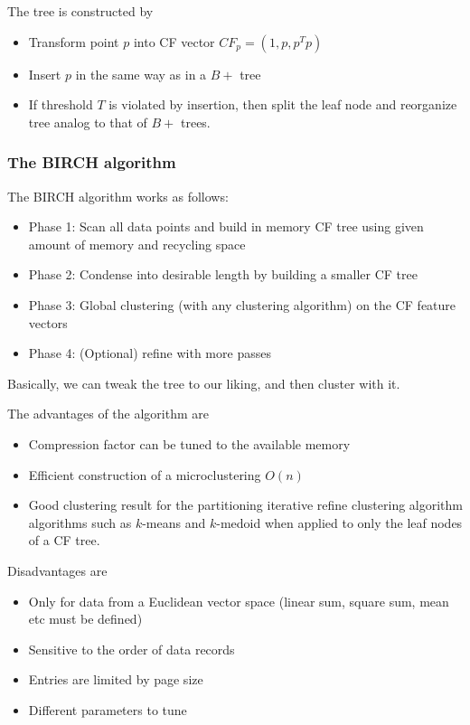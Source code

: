 The tree is constructed by
\begin{itemize}
    \item Transform point $p$ into CF vector $CF_p = (1, p, p^Tp)$
    \item Insert $p$ in the same way as in a $B+$ tree
    \item If threshold $T$ is violated by insertion, then split the leaf node and reorganize tree analog to that of $B+$ trees.
\end{itemize}

\subsubsection{The BIRCH algorithm}
    The BIRCH algorithm works as follows:
    \begin{itemize}
        \item Phase 1: Scan all data points and build in memory CF tree using given amount of memory and recycling space
        \item Phase 2: Condense into desirable length by building a smaller CF tree
        \item Phase 3: Global clustering (with any clustering algorithm) on the CF feature vectors
        \item Phase 4: (Optional) refine with more passes
    \end{itemize}
Basically, we can tweak the tree to our liking, and then cluster with it.

The advantages of the algorithm are
\begin{itemize}
    \item Compression factor can be tuned to the available memory
    \item Efficient construction of a microclustering $O(n)$
    \item Good clustering result for the partitioning iterative refine clustering algorithm algorithms such as $k$-means and $k$-medoid when applied to only the leaf nodes of a CF tree.
\end{itemize}
Disadvantages are
\begin{itemize}
    \item Only for data from a Euclidean vector space (linear sum, square sum, mean etc must be defined)
    \item Sensitive to the order of data records
    \item Entries are limited by page size
    \item Different parameters to tune
\end{itemize}

